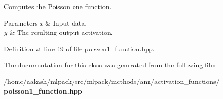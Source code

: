 Computes the Poisson one function. 


\begin{DoxyParams}{Parameters}
{\em x} & Input data. \\
\hline
{\em y} & The resulting output activation. \\
\hline
\end{DoxyParams}


Definition at line 49 of file poisson1\+\_\+function.\+hpp.



The documentation for this class was generated from the following file\+:\begin{DoxyCompactItemize}
\item 
/home/aakash/mlpack/src/mlpack/methods/ann/activation\+\_\+functions/\textbf{ poisson1\+\_\+function.\+hpp}\end{DoxyCompactItemize}
